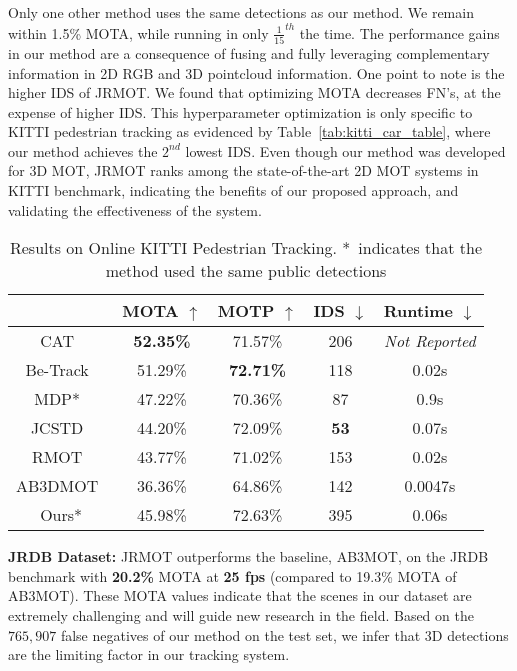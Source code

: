 \documentclass[letterpaper, 10 pt, conference]{ieeeconf}
\newcommand{\jrdb}{JRDB\xspace}
\newcommand{\methodname}{{JRMOT}\xspace}
\begin{document}
Only one other method uses the same detections as our method. We remain within 1.5\% MOTA, while running in only $\frac{1}{15}^{th}$ the time.
The performance gains in our method are a consequence of fusing and fully leveraging complementary information in 2D RGB and 3D pointcloud information. 
One point to note is the higher IDS of \methodname. We found that optimizing MOTA decreases FN's, at the expense of higher IDS. This hyperparameter optimization is only specific to KITTI pedestrian tracking as evidenced by Table~\ref{tab:kitti_car_table}, where our method achieves the $2^{nd}$ lowest IDS.
Even though our method was developed for 3D MOT, \methodname ranks among the state-of-the-art 2D MOT systems in KITTI benchmark, indicating the benefits of our proposed approach, and validating the effectiveness of the system.
\begin{table}[th!]
\footnotesize
    \centering
\begin{tabular}{ | c | c | c | c | c |}
\hline
 & MOTA $\uparrow$ & MOTP $\uparrow$ & IDS $\downarrow$ & Runtime $\downarrow$\\ 
   \hline\hline
 CAT~\cite{nguyen2019ISPRS} & \bf 52.35\% & 71.57\% & 206 &  \textit{Not Reported}\\ \hline
 Be-Track~\cite{Dimitrievski2019sensors} & 51.29\% & \bf 72.71\% & 118 & 0.02s\\
 \hline
 MDP*~\cite{Xiang_2015_ICCV} & 47.22\% & 70.36\% & 87 & 0.9s \\ \hline
 JCSTD~\cite{8621602} & 44.20\% & 72.09\% & \bf 53 & 0.07s \\ \hline
RMOT~\cite{7045866} & 43.77\% & 71.02\% & 153 & 0.02s \\ \hline
 AB3DMOT~\cite{Weng2019_3dmot} & 36.36\% & 64.86\% & 142 & 0.0047s \\ 
 \hline\hline
 Ours* & 45.98\% & 72.63\% & 395 & 0.06s \\
\hline
\end{tabular}
    \caption{Results on Online KITTI Pedestrian Tracking. *~indicates that the method used the same public detections}
    \label{tab:kitti_ped_table}
    \vspace{-5pt}
\end{table}

\textbf{\jrdb Dataset:} 
\methodname outperforms the baseline, AB3MOT, on the \jrdb benchmark with \textbf{20.2\%} MOTA at \textbf{25 fps} (compared to 19.3\% MOTA of AB3MOT). These MOTA values indicate that the scenes in our dataset are extremely challenging and will guide new research in the field. Based on the $765,907$ false negatives of our method on the test set, we infer that 3D detections are the limiting factor in our tracking system. 
\end{document}
